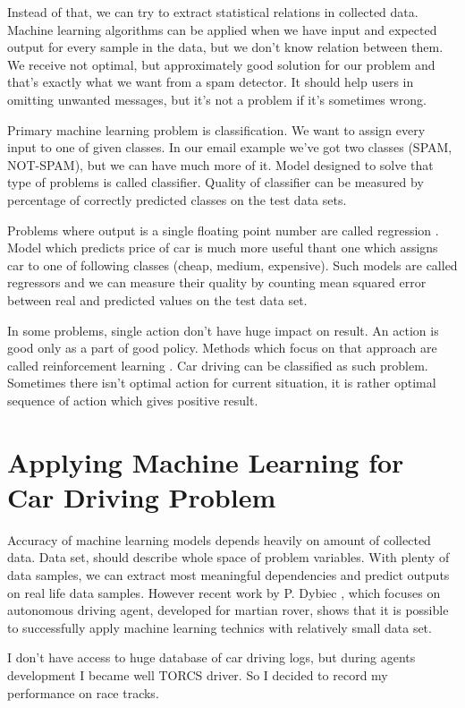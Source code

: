 \documentclass[declaration,shortabstract,english,inz]{iithesis}
\begin{document}
 Instead of that, we can try to extract statistical relations in collected data.
Machine learning algorithms can be applied when we have input and expected output for every sample in the data, but we don't know relation between them.
We receive not optimal, but approximately good solution for our problem and that's exactly what we want from a spam detector.
It should help users in omitting unwanted messages, but it's not a problem if it's sometimes wrong.

 Primary machine learning problem is classification\cite{Introduction_ML}.
We want to assign every input to one of given classes.
In our email example we've got two classes (SPAM, NOT-SPAM), but we can have much more of it.
Model designed to solve that type of problems is called classifier.
Quality of classifier can be measured by percentage of correctly predicted classes on the test data sets.

 Problems where output is a single floating point number are called regression \cite{Introduction_ML}.
Model which predicts price of car is much more useful thant one which assigns car to one of following classes  (cheap, medium, expensive).
Such models are called regressors and we can measure their quality by counting mean squared error between real and predicted values on the test data set.

In some problems, single action don't have huge impact on result.
An action is good only as a part of good policy.
Methods which focus on that approach are called reinforcement learning \cite{Introduction_ML}.
Car driving can be classified as such problem.
Sometimes there isn't optimal action for current situation, it is rather optimal sequence of action which gives positive result.


\section{Applying Machine Learning for Car Driving Problem}

Accuracy of machine learning models depends heavily on amount of collected data.
Data set, should describe whole space of problem variables.
With plenty of data samples, we can extract most meaningful dependencies and predict outputs on real life data samples.
However recent work by P. Dybiec \cite[2018]{rover}, which focuses on autonomous driving agent, developed for martian rover, shows that it is possible to successfully apply machine learning technics with relatively small data set.

  
I don't have access to huge database of car driving logs, but during agents development I became well TORCS driver.
So I decided to record my performance on race tracks.
\end{document}
